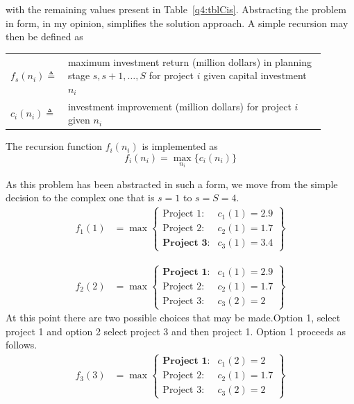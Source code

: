 \documentclass[a4paper,11pt]{article}
\begin{document}
with the remaining values present in Table~\ref{q4:tblCis}. Abstracting the problem in form, in my opinion, simplifies the solution approach. A simple recursion may then be defined as

\vspace{12pt}

\begin{tabular}{p{0.1\linewidth}  p{0.8\linewidth}}
	$f_s(n_i) \triangleq$ & maximum investment return (million dollars) in planning stage $s, s+1,\dots,S$ for project $i$ given capital investment $n_i$ \\
	$c_i(n_i) \triangleq$ & investment improvement (million dollars) for project $i$ given $n_i$
\end{tabular}

\vspace{12pt}

The recursion function $f_i(n_i)$ is implemented as
\begin{equation}
	f_i(n_i) = \max_{n_i}\{c_i(n_i)\}
\end{equation}

As this problem has been abstracted in such a form, we move from the simple decision to the complex one that is $s = 1$ to $s = S = 4$.
\begin{align}
	f_1(1) &= \max 
	\begin{Bmatrix}
		\text{Project 1}: & c_1(1) = 2.9 \\
		\text{Project 2}: & c_2(1) =1.7 \\
		\textbf{Project 3}: & c_3(1) =3.4
	\end{Bmatrix}
\end{align}	

\begin{align}
	f_2(2) &= \max 
	\begin{Bmatrix}
		\textbf{Project 1}: & c_1(1) = 2.9 \\
		\text{Project 2}: & c_2(1) =1.7 \\
		\text{Project 3}: & c_3(2) =2
	\end{Bmatrix}
\end{align}	
At this point there are two possible choices that may be made.Option 1, select project 1 and option 2 select project 3 and then project 1. Option 1 proceeds as follows.
\begin{align}
	f_3(3) &= \max 
	\begin{Bmatrix}
		\textbf{Project 1}: & c_1(2) = 2 \\
		\text{Project 2}: & c_2(1) =1.7 \\
		\text{Project 3}: & c_3(2) =2
	\end{Bmatrix}
\end{align}	
\end{document}
